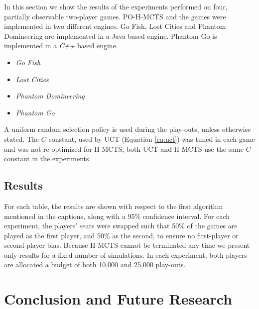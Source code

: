 \documentclass[a4paper]{llncs}
\begin{document}
In this section we show the results of the experiments performed on four, partially observable two-player games. PO-H-MCTS and the games were implemented in two different engines. Go Fish, Lost Cities and Phantom Domineering are implemented in a Java based engine. Phantom Go is implemented in a \emph{C++} based engine.
\begin{itemize}
\item \emph{Go Fish} 
\item \emph{Lost Cities}
\item \emph{Phantom Domineering}
\item \emph{Phantom Go} 
\end{itemize}

A uniform random selection policy is used during the play-outs, unless otherwise stated. The $C$ constant, used by UCT (Equation \ref{eq:uct}) was tuned in each game and was not re-optimized for H-MCTS, both UCT and H-MCTS use the same $C$ constant in the experiments.

\subsection{Results}
\label{subsec:results}

For each table, the results are shown with respect to the first algorithm mentioned in the captions, along with a 95\% confidence interval. For each experiment, the players' seats were swapped such that 50\% of the games are played as the first player, and 50\% as the second, to ensure no first-player or second-player bias. Because H-MCTS cannot be terminated any-time we present only results for a fixed number of simulations. In each experiment, both players are allocated a budget of both 10,000 and 25,000 play-outs.

\section{Conclusion and Future Research}
\label{sec:concl}



\end{document}
